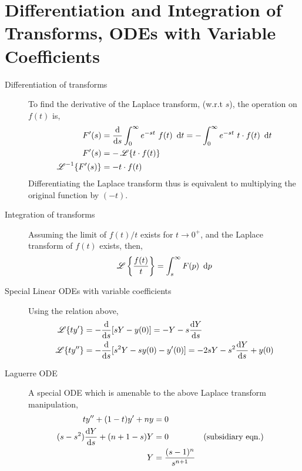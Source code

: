 \section{Differentiation and Integration of Transforms, ODEs with Variable Coefficients}
\begin{description}
    \item[Differentiation of transforms] To find the derivative of the Laplace transform,
        (w.r.t $ s $), the operation on $ f(t) $ is,
        \begin{align}
            F'(s)              & = \diff**{s}{\infint e^{-st}\ f(t)\ \dl t}
            = - \infint e^{-st}\ t \cdot f(t)\ \dl t                        \\
            F'(s)              & = -\Lap\{t \cdot f(t)\}                    \\
            \Lap^{-1}\{F'(s)\} & = -t \cdot f(t)
        \end{align}
        Differentiating the Laplace transform thus is equivalent to multiplying the
        original function by $ (-t) $.
    \item[Integration of transforms] Assuming the limit of $ f(t) / t $ exists for
        $ t \rightarrow 0^+ $, and the Laplace transform of $ f(t) $ exists, then,
        \begin{align}
            \Lap\left\{ \frac{f(t)}{t} \right\} & = \int_{s}^{\infty} F(p)\ \dl p \\
        \end{align}
    \item[Special Linear ODEs with variable coefficients] Using the relation above,
        \begin{align}
            \Lap\{ty'\}  & = -\diff**{s}{[sY - y(0)]} = -Y - s \diff Ys \\
            \Lap\{ty''\} & = -\diff**{s}{[s^2Y - sy(0) - y'(0)]}
            = -2sY - s^2 \diff Ys + y(0)
        \end{align}
    \item[Laguerre ODE] A special ODE which is amenable to the above Laplace transform
        manipulation,
        \begin{align}
            ty'' + (1 - t)y' + ny             & = 0                         \\
            (s - s^2) \diff Ys + (n + 1 - s)Y & = 0                       &
                                              & \text{(subsidiary eqn.)}    \\
            Y                                 & = \frac{(s-1)^n}{s^{n+1}}   \\

\end{align}
\end{description}
